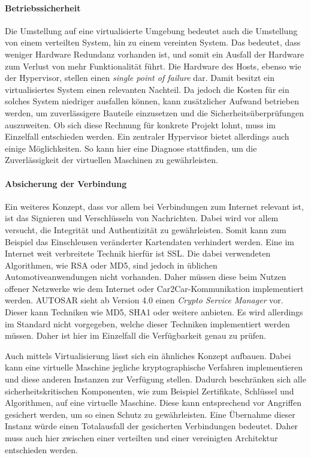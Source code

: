 \documentclass[
  a4paper,					    %
  twoside,
  DIV=calc,     				%
  bibliography=totoc,
  cleardoublepage=empty,
  ngerman,     					%
  final       					%
]{scrbook}
\begin{document}
\paragraph{Betriebssicherheit}
Die Umstellung auf eine virtualisierte Umgebung bedeutet auch die Umstellung von einem verteilten System, hin zu einem vereinten System. Das bedeutet, dass weniger Hardware Redundanz vorhanden ist, und somit ein Ausfall der Hardware zum Verlust von mehr Funktionalität führt. Die Hardware des Hosts, ebenso wie der Hypervisor, stellen einen \emph{single point of failure} dar. Damit besitzt ein virtualisiertes System einen relevanten Nachteil. Da jedoch die Kosten für ein solches System niedriger ausfallen können, kann zusätzlicher Aufwand betrieben werden, um zuverlässigere Bauteile einzusetzen und die Sicherheitsüberprüfungen auszuweiten. Ob sich diese Rechnung für konkrete Projekt lohnt, muss im Einzelfall entschieden werden. Ein zentraler Hypervisor bietet allerdings auch einige Möglichkeiten. So kann hier eine Diagnose stattfinden, um die Zuverlässigkeit der virtuellen Maschinen zu gewährleisten. 


\paragraph{Absicherung der Verbindung}
Ein weiteres Konzept, dass vor allem bei Verbindungen zum Internet relevant ist, ist das Signieren und Verschlüsseln von Nachrichten. Dabei wird vor allem versucht, die Integrität und Authentizität zu gewährleisten. Somit kann zum Beispiel das Einschleusen veränderter Kartendaten verhindert werden. Eine im Internet weit verbreitete Technik hierfür ist SSL. Die dabei verwendeten Algorithmen, wie RSA oder MD5, sind jedoch in üblichen Automotiveanwendungen nicht vorhanden. Daher müssen diese beim Nutzen offener Netzwerke wie dem Internet oder Car2Car-Kommunikation implementiert werden. AUTOSAR sieht ab Version 4.0 einen \emph{Crypto Service Manager} vor. Dieser kann Techniken wie MD5, SHA1 oder weitere anbieten. Es wird allerdings im Standard nicht vorgegeben, welche dieser Techniken implementiert werden müssen. Daher ist hier im Einzelfall die Verfügbarkeit genau zu prüfen.

Auch mittels Virtualisierung lässt sich ein ähnliches Konzept aufbauen. Dabei kann eine virtuelle Maschine jegliche kryptographische Verfahren implementieren und diese anderen Instanzen zur Verfügung stellen. Dadurch beschränken sich alle sicherheitskritischen Komponenten, wie zum Beispiel Zertifikate, Schlüssel und Algorithmen, auf eine virtuelle Maschine. Diese kann entsprechend vor Angriffen gesichert werden, um so einen Schutz zu gewährleisten. Eine Übernahme dieser Instanz würde einen Totalausfall der gesicherten Verbindungen bedeutet. Daher muss auch hier zwischen einer verteilten und einer vereinigten Architektur entschieden werden.
\end{document}

